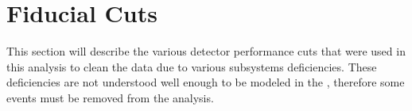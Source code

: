 \section{Fiducial Cuts}\label{sec:analysis.data.reduction}
This section will describe the various detector performance cuts that were used in this analysis to clean the data due to various subsystems deficiencies. These deficiencies are not understood well enough to be modeled in the , therefore some events must be removed from the analysis. 




